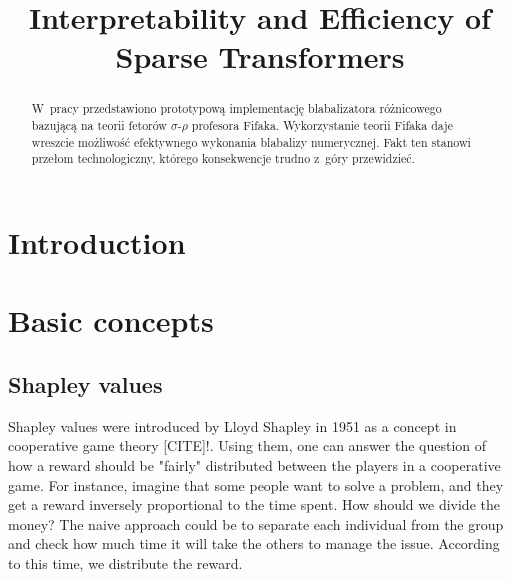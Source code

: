 \documentclass[magisterska,en]{pracamgr}
\title{Interpretability and Efficiency of Sparse Transformers}
\begin{document}
\maketitle

\begin{abstract}
  W~pracy przedstawiono prototypową implementację blabalizatora
  różnicowego bazującą na teorii fetorów $\sigma$-$\rho$ profesora
  Fifaka.  Wykorzystanie teorii Fifaka daje wreszcie możliwość
  efektywnego wykonania blabalizy numerycznej.  Fakt ten stanowi
  przełom technologiczny, którego konsekwencje trudno z~góry
  przewidzieć.
\end{abstract}

\tableofcontents

\chapter*{Introduction}


\chapter{Basic concepts}\label{r:concepts}


\section{Shapley values}
Shapley values were introduced by Lloyd Shapley in 1951 as a concept in cooperative game theory [CITE]!.
Using them, one can answer the question of how a reward should be "fairly" distributed between the players in a cooperative game. For instance, imagine that some people want to solve a problem, and they get a reward inversely proportional to the time spent. How should we divide the money? The naive approach could be to separate each individual from the group and check how much time it will take the others to manage the issue. According to this time, we distribute the reward.
\end{document}

